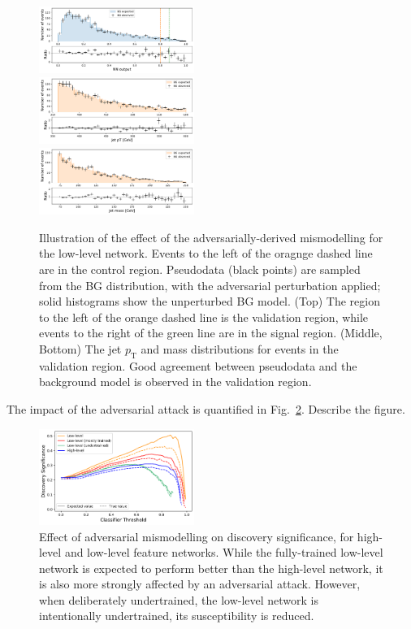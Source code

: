 \documentclass[reprint,nofootinbib,...]{revtex4-1}
\newcommand{\pt}{p_\mathrm{T}} %
\begin{document}
\begin{figure}[h!]
\centering
\includegraphics[width=0.45\textwidth]{figures/pseudodata_NN_PFN.pdf} \\
\includegraphics[width=0.45\textwidth]{figures/pseudodata_pt_PFN.pdf} \\
\includegraphics[width=0.45\textwidth]{figures/pseudodata_mass_PFN.pdf} 
\caption{Illustration of the effect of the adversarially-derived mismodelling for the low-level network.
Events to the left of the oragnge dashed line are in the control region.
Pseudodata (black points) are sampled from the BG distribution, with the adversarial perturbation applied; solid histograms show the unperturbed BG model.
(Top) The region to the left of the orange dashed line is the validation region, while events to the right of the green line are in the signal region.
(Middle, Bottom) The jet $\pt$ and mass distributions for events in the validation region.
Good agreement between pseudodata and the background model is observed in the validation region.
}
\label{fig:method2}
\end{figure}

The impact of the adversarial attack is quantified in Fig.~\ref{fig:method2b}.  Describe the figure. 

\begin{figure}[h!]
\centering
\includegraphics[width=0.45\textwidth]{figures/adversary_significance.pdf}
\caption{Effect of adversarial mismodelling on discovery significance, for high-level and low-level feature networks.
While the fully-trained low-level network is expected to perform better than the high-level network, it is also more strongly affected by an adversarial attack.
However, when deliberately undertrained, the low-level network is intentionally undertrained, its susceptibility is reduced.
}
\label{fig:method2b}
\end{figure}
\end{document}
